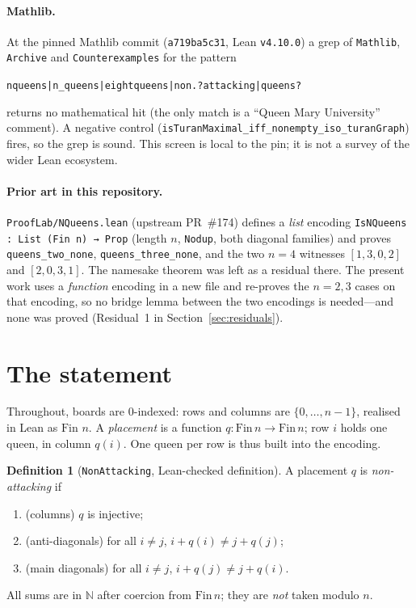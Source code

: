 \documentclass[11pt,a4paper]{article}
\theoremstyle{definition}
\newtheorem{definition}[theorem]{Definition}
\theoremstyle{remark}
\newcommand{\lean}[1]{\texttt{#1}}
\newcommand{\N}{\mathbb{N}}
\newcommand{\Fin}{\mathrm{Fin}\,}
\begin{document}
\paragraph{Mathlib.}
At the pinned Mathlib commit (\texttt{a719ba5c31}, Lean \texttt{v4.10.0}) a grep of
\texttt{Mathlib}, \texttt{Archive} and \texttt{Counterexamples} for the pattern
\begin{center}\small\texttt{nqueens|n\_queens|eightqueens|non.?attacking|queens?}\end{center}
returns no mathematical hit (the only match is a ``Queen Mary University'' comment). A negative control
(\lean{isTuranMaximal\_iff\_nonempty\_iso\_turanGraph}) fires, so the grep is sound.
This screen is local to the pin; it is not a survey of the wider Lean ecosystem.

\paragraph{Prior art in this repository.}
\label{sec:prior}
\texttt{ProofLab/NQueens.lean} (upstream PR~\#174) defines a \emph{list} encoding
\lean{IsNQueens : List (Fin n) → Prop} (length $n$, \lean{Nodup}, both diagonal families)
and proves \lean{queens\_two\_none}, \lean{queens\_three\_none}, and the two $n=4$
witnesses $[1,3,0,2]$ and $[2,0,3,1]$. The namesake theorem was left as a residual there.
The present work uses a \emph{function} encoding in a new file and re-proves the $n=2,3$
cases on that encoding, so no bridge lemma between the two encodings is needed---and none
was proved (Residual~1 in Section~\ref{sec:residuals}).

\section{The statement}
\label{sec:statement}

Throughout, boards are $0$-indexed: rows and columns are $\{0,\dots,n-1\}$, realised in
Lean as $\Fin\,n$. A \emph{placement} is a function $q:\Fin n\to\Fin n$; row $i$ holds
one queen, in column $q(i)$. One queen per row is thus built into the encoding.

\begin{definition}[\lean{NonAttacking}, Lean-checked definition]
\label{def:nonattacking}
A placement $q$ is \emph{non-attacking} if
\begin{enumerate}[nosep,label=(\roman*)]
\item (columns) $q$ is injective;
\item (anti-diagonals) for all $i\neq j$, $i+q(i)\neq j+q(j)$;
\item (main diagonals) for all $i\neq j$, $i+q(j)\neq j+q(i)$.
\end{enumerate}
All sums are in $\N$ after coercion from $\Fin n$; they are \emph{not} taken modulo $n$.
\end{definition}
\end{document}
